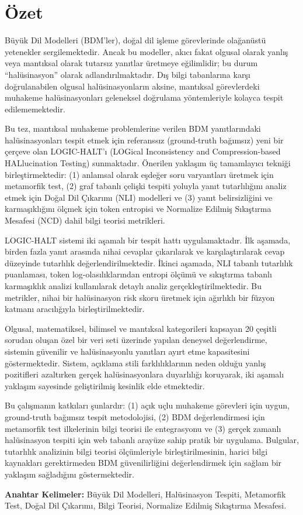 \chapter*{Özet}

Büyük Dil Modelleri (BDM'ler), doğal dil işleme görevlerinde olağanüstü yetenekler sergilemektedir. Ancak bu modeller, akıcı fakat olgusal olarak yanlış veya mantıksal olarak tutarsız yanıtlar üretmeye eğilimlidir; bu durum ``halüsinasyon'' olarak adlandırılmaktadır. Dış bilgi tabanlarına karşı doğrulanabilen olgusal halüsinasyonların aksine, mantıksal görevlerdeki muhakeme halüsinasyonları geleneksel doğrulama yöntemleriyle kolayca tespit edilememektedir.

Bu tez, mantıksal muhakeme problemlerine verilen BDM yanıtlarındaki halüsinasyonları tespit etmek için referanssız (ground-truth bağımsız) yeni bir çerçeve olan LOGIC-HALT'ı (LOGical Inconsistency and Compression-based HALlucination Testing) sunmaktadır. Önerilen yaklaşım üç tamamlayıcı tekniği birleştirmektedir: (1) anlamsal olarak eşdeğer soru varyantları üretmek için metamorfik test, (2) graf tabanlı çelişki tespiti yoluyla yanıt tutarlılığını analiz etmek için Doğal Dil Çıkarımı (NLI) modelleri ve (3) yanıt belirsizliğini ve karmaşıklığını ölçmek için token entropisi ve Normalize Edilmiş Sıkıştırma Mesafesi (NCD) dahil bilgi teorisi metrikleri.

LOGIC-HALT sistemi iki aşamalı bir tespit hattı uygulamaktadır. İlk aşamada, birden fazla yanıt arasında nihai cevaplar çıkarılarak ve karşılaştırılarak cevap düzeyinde tutarlılık değerlendirilmektedir. İkinci aşamada, NLI tabanlı tutarlılık puanlaması, token log-olasılıklarından entropi ölçümü ve sıkıştırma tabanlı karmaşıklık analizi kullanılarak detaylı analiz gerçekleştirilmektedir. Bu metrikler, nihai bir halüsinasyon risk skoru üretmek için ağırlıklı bir füzyon katmanı aracılığıyla birleştirilmektedir.

Olgusal, matematiksel, bilimsel ve mantıksal kategorileri kapsayan 20 çeşitli sorudan oluşan özel bir veri seti üzerinde yapılan deneysel değerlendirme, sistemin güvenilir ve halüsinasyonlu yanıtları ayırt etme kapasitesini göstermektedir. Sistem, açıklama stili farklılıklarının neden olduğu yanlış pozitifleri azaltırken gerçek halüsinasyonlara duyarlılığı koruyarak, iki aşamalı yaklaşım sayesinde geliştirilmiş kesinlik elde etmektedir.

Bu çalışmanın katkıları şunlardır: (1) açık uçlu muhakeme görevleri için uygun, ground-truth bağımsız tespit metodolojisi, (2) BDM değerlendirmesi için metamorfik test ilkelerinin bilgi teorisi ile entegrasyonu ve (3) gerçek zamanlı halüsinasyon tespiti için web tabanlı arayüze sahip pratik bir uygulama. Bulgular, tutarlılık analizinin bilgi teorisi ölçümleriyle birleştirilmesinin, harici bilgi kaynakları gerektirmeden BDM güvenilirliğini değerlendirmek için sağlam bir yaklaşım sağladığını göstermektedir.

\vfill
\textbf{Anahtar Kelimeler:} Büyük Dil Modelleri, Halüsinasyon Tespiti, Metamorfik Test, Doğal Dil Çıkarımı, Bilgi Teorisi, Normalize Edilmiş Sıkıştırma Mesafesi.
\clearpage
